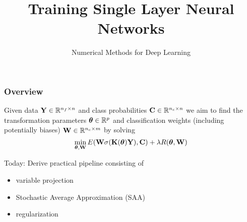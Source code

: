 \documentclass[12pt,fleqn]{beamer}
\title{Training Single Layer Neural Networks}
\subtitle{Numerical Methods for Deep Learning}
\date{}
\begin{document}
\makebeamertitle


\begin{frame}[fragile]\frametitle{Overview}

Given data ${\bf Y} \in \mathbb{R}^{n_f\times n}$ and class probabilities ${\bf C}\in\mathbb{R}^{n_c\times n}$ we aim to find the transformation parameters ${\boldsymbol \theta}\in\mathbb{R}^p$ and classification weights (including potentially biases) ${\bf W} \in \mathbb{R}^{n_c \times m}$ by solving
$$
\min_{{\boldsymbol \theta},{\bf W}} E({\bf W} \sigma({\bf K}({\boldsymbol \theta}){\bf Y}), {\bf C}) + \lambda R({\boldsymbol \theta},{\bf W})
$$

Today: Derive practical pipeline consisting of 
\begin{itemize}
	\item variable projection
	\item Stochastic Average Approximation (SAA)
	\item regularization
\end{itemize}


\end{frame}
\end{document}
